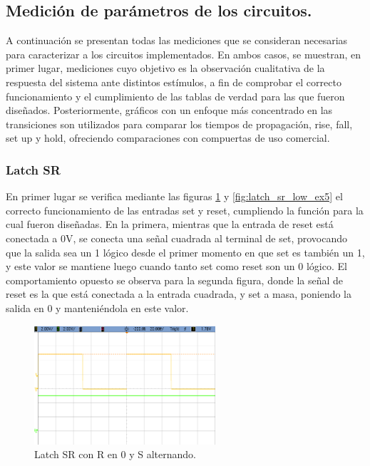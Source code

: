 \subsection{Medición de parámetros de los circuitos.}
A continuación se presentan todas las mediciones que se consideran necesarias para caracterizar a los circuitos implementados.
En ambos casos, se muestran, en primer lugar, mediciones cuyo objetivo es la observación cualitativa de la respuesta del sistema ante distintos estímulos, a fin de 
comprobar el correcto funcionamiento y el cumplimiento de las tablas de verdad para las que fueron diseñados.
Posteriormente, gráficos con un enfoque más concentrado en las transiciones son utilizados para comparar los tiempos de propagación, rise, fall, set up y hold, 
ofreciendo comparaciones con compuertas de uso comercial.


\subsubsection{Latch SR}
En primer lugar se verifica mediante las figuras \ref{fig:latch_sr_high_ex5} y \ref{fig:latch_sr_low_ex5} el correcto funcionamiento de las entradas set y reset, cumpliendo 
la función para la cual fueron diseñadas.
En la primera, mientras que la entrada de reset está conectada a 0V, se conecta una señal cuadrada al terminal de set, provocando que la salida sea un 1 lógico desde el 
primer momento en que set es también un 1, y este valor se mantiene luego cuando tanto set como reset son un 0 lógico.
El comportamiento opuesto se observa para la segunda figura, donde la señal de reset es la que está conectada a la entrada cuadrada, y set a masa, poniendo la salida en 0 
y manteniéndola en este valor.

\begin{figure}[H]
    \centering
    \includegraphics[width=0.6\textwidth]{../EJ6/Recursos/latch_sr_high}
    \caption{Latch SR con R en 0 y S alternando.}
    \label{fig:latch_sr_high_ex5}
\end{figure}

